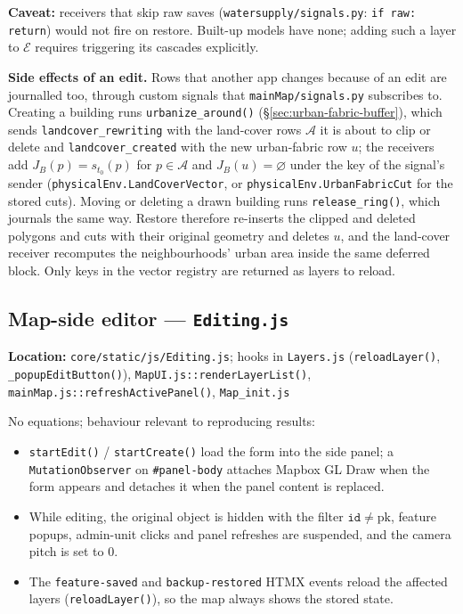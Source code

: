 \documentclass[11pt]{article}
\newcommand{\code}[1]{\texttt{#1}}
\begin{document}
\textbf{Caveat:} receivers that skip raw saves (\code{watersupply/signals.py}: \code{if raw: return}) would not fire on restore. Built-up models have none; adding such a layer to $\mathcal{E}$ requires triggering its cascades explicitly.

\textbf{Side effects of an edit.} Rows that another app changes because of an edit are journalled too, through custom signals that \code{mainMap/signals.py} subscribes to. Creating a building runs \code{urbanize\_around()} (\S\ref{sec:urban-fabric-buffer}), which sends \code{landcover\_rewriting} with the land-cover rows $\mathcal{A}$ it is about to clip or delete and \code{landcover\_created} with the new urban-fabric row $u$; the receivers add $J_B(p) = s_{t_0}(p)$ for $p \in \mathcal{A}$ and $J_B(u) = \varnothing$ under the key of the signal's sender (\code{physicalEnv.LandCoverVector}, or \code{physicalEnv.UrbanFabricCut} for the stored cuts). Moving or deleting a drawn building runs \code{release\_ring()}, which journals the same way. Restore therefore re-inserts the clipped and deleted polygons and cuts with their original geometry and deletes $u$, and the land-cover receiver recomputes the neighbourhoods' urban area inside the same deferred block. Only keys in the vector registry are returned as layers to reload.

\subsection{Map-side editor --- \code{Editing.js}}
\textbf{Location:} \code{core/static/js/Editing.js}; hooks in \code{Layers.js} (\code{reloadLayer()}, \code{\_popupEditButton()}), \code{MapUI.js::renderLayerList()}, \code{mainMap.js::refreshActivePanel()}, \code{Map\_init.js}

No equations; behaviour relevant to reproducing results:
\begin{itemize}[nosep]
  \item \code{startEdit()} / \code{startCreate()} load the form into the side panel; a \code{MutationObserver} on \code{\#panel-body} attaches Mapbox GL Draw when the form appears and detaches it when the panel content is replaced.
  \item While editing, the original object is hidden with the filter $\texttt{id} \neq \mathrm{pk}$, feature popups, admin-unit clicks and panel refreshes are suspended, and the camera pitch is set to $0$.
  \item The \code{feature-saved} and \code{backup-restored} HTMX events reload the affected layers (\code{reloadLayer()}), so the map always shows the stored state.
\end{itemize}
\end{document}
